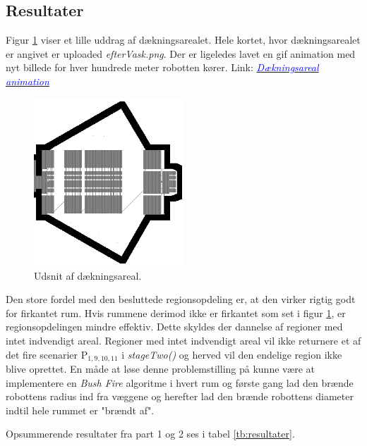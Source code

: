 \newpage
\subsection{Resultater}
Figur \ref{fig:res} viser et lille uddrag af dækningsarealet. Hele kortet, hvor dækningsarealet er angivet er uploaded \emph{efterVask.png}. Der er ligeledes lavet en gif animation med nyt billede for hver hundrede meter robotten kører. Link: \href{https://www.dropbox.com/s/obg8nx13bntwrsp/Part\%201-2\%20animation.gif}{\textcolor{blue}{\textit{Dækningsareal animation}}}


\begin{figure}[th!]
\centering
\includegraphics[width=0.5\textwidth]{./graphics/efterVask}
\caption[tekst i indholdsfortegnelsen]{Udsnit af dækningsareal.}
\label{fig:res}
\end{figure}
Den store fordel med den besluttede regionsopdeling er, at den virker rigtig godt for firkantet rum. Hvis rummene derimod ikke er firkantet som set i figur \ref{fig:res}, er regionsopdelingen mindre effektiv. Dette skyldes der dannelse af regioner med intet indvendigt areal. Regioner med intet indvendigt areal vil ikke returnere et af det fire scenarier P\(_{1, 9, 10, 11}\) i \emph{stageTwo()} og herved vil den endelige region ikke blive oprettet.
En måde at løse denne problemstilling på kunne være at implementere en \emph{Bush Fire} algoritme i hvert rum og første gang lad den brænde robottens radius ind fra væggene og herefter lad den brænde robottens diameter indtil hele rummet er "brændt af".


Opsummerende resultater fra part 1 og 2 ses i tabel \ref{tb:resultater}. 

